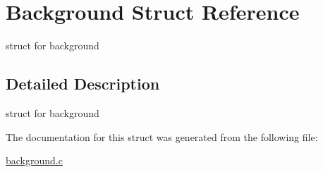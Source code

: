 \hypertarget{structBackground}{}\section{Background Struct Reference}
\label{structBackground}


struct for background  




\subsection{Detailed Description}
struct for background 

The documentation for this struct was generated from the following file\+:\begin{DoxyCompactItemize}
\item 
\hyperlink{background_8c}{background.\+c}\end{DoxyCompactItemize}
